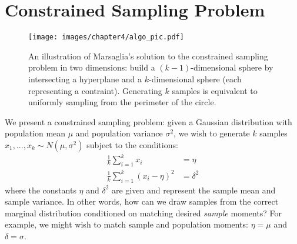 


\section{Constrained Sampling Problem}
\label{sec:methods}

\begin{figure}
    \centering
    \texttt{[image: images/chapter4/algo\_pic.pdf]}
    \caption{An illustration of Marsaglia's solution to the constrained sampling problem in two dimensions: build a $(k-1)$-dimensional sphere by intersecting a hyperplane and a $k$-dimensional sphere (each representing a contraint). Generating $k$ samples is equivalent to uniformly sampling from the perimeter of the circle.}
    \label{fig:algo}
\end{figure}



We present a constrained sampling problem: given a Gaussian distribution with population mean $\mu$ and population variance $\sigma^2$, we wish to generate $k$ samples $x_1, ..., x_k \sim N(\mu, \sigma^2)$ subject to the conditions:
%
\begin{align}
    \frac{1}{k}\sum_{i=1}^{k} x_i &= \eta  \label{eqn:constraint1}\\
    \frac{1}{k}\sum_{i=1}^{k} (x_i - \eta)^2 &= \delta^2 \label{eqn:constraint2}
\end{align}
%
where the constants $\eta$ and $\delta^2$ are given and represent the sample mean and sample variance. In other words, how can we draw samples from the correct marginal distribution conditioned on matching desired \emph{sample} moments? For example, we might wish to match sample and population moments: $\eta=\mu$ and $\delta=\sigma$.

